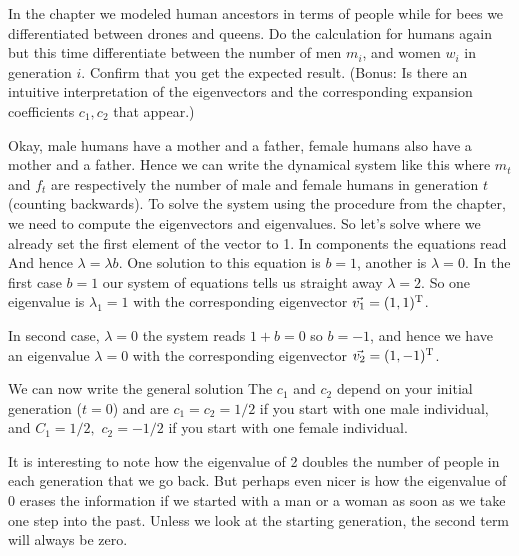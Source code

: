 In the chapter we modeled human ancestors in terms of people while for bees we differentiated between drones and queens. 
Do the calculation for humans again but this time differentiate between the number of men $m_i$, and women $w_i$ in generation $i$. Confirm that you get the expected result. 
(Bonus: Is there an intuitive interpretation of the eigenvectors and the corresponding expansion coefficients $c_1,c_2$ that appear.) 

\solution 
Okay, male humans have a mother and a father, female humans also have a mother and a father. Hence we can write the dynamical system like this 
where $m_t$ and $f_t$ are respectively the number of male and female humans in generation $t$ (counting backwards). To solve the system using the procedure from the chapter, we need to compute the eigenvectors and eigenvalues. So let's solve 
where we already set the first element of the vector to 1. In components the equations read
And hence $\lambda = \lambda b$. One solution to this equation is $b=1$, another is $\lambda=0$. In the first case $b=1$ our system of equations tells us straight away $\lambda=2$. So one eigenvalue is $\lambda_1=1$ with the corresponding eigenvector $\vec{v_1}=(1,1)^{\rm T}$. 

In second case, $\lambda=0$ the system reads $1+b=0$ so $b=-1$, and hence we have an eigenvalue $\lambda=0$ with the corresponding eigenvector $\vec{v_2} = (1,-1)^{\rm T}$. 

We can now write the general solution
The $c_1$ and $c_2$ depend on your initial generation ($t=0$) and are $c_1=c_2=1/2$ if you start with one male individual, and $C_1=1/2,$ $c_2=-1/2$ if you start with one female individual.

It is interesting to note how the eigenvalue of 2 doubles the number of people in each generation that we go back. But perhaps even nicer is how the eigenvalue of 0 erases the information if we started with a man or a woman as soon as we take one step into the past. Unless we look at the starting generation, the second term will always be zero. 


